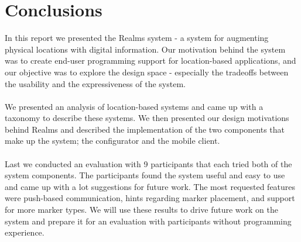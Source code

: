 \section{Conclusions}
\label{sec.conclusions}
In this report we presented the Realms system - a system for augmenting physical locations with digital information. Our motivation behind the system was to create end-user programming support for location-based applications, and our objective was to explore the design space - especially the tradeoffs between the usability and the expressiveness of the system. 
\\\\
We presented an analysis of location-based systems and came up with a taxonomy to describe these systems. We then presented our design motivations behind Realms and described the implementation of the two components that make up the system; the configurator and the mobile client.
\\\\
Last we conducted an evaluation with 9 participants that each tried both of the system components. The participants found the system useful and easy to use and came up with a lot suggestions for future work. The most requested features were push-based communication, hints regarding marker placement, and support for more marker types. We will use these results to drive future work on the system and prepare it for an evaluation with participants without programming experience. 